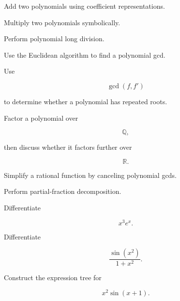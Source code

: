 \begin{exercise}[2]
Add two polynomials using coefficient representations.
\end{exercise}

\begin{exercise}[2]
Multiply two polynomials symbolically.
\end{exercise}

\begin{exercise}[3]
Perform polynomial long division.
\end{exercise}

\begin{exercise}[3]
Use the Euclidean algorithm to find a polynomial gcd.
\end{exercise}

\begin{exercise}[3]
Use

\[
\gcd(f,f')
\]

to determine whether a polynomial has repeated roots.
\end{exercise}

\begin{exercise}[3]
Factor a polynomial over

\[
\mathbb{Q},
\]

then discuss whether it factors further over

\[
\mathbb{R}.
\]
\end{exercise}

\begin{exercise}[2]
Simplify a rational function by canceling polynomial gcds.
\end{exercise}

\begin{exercise}[3]
Perform partial-fraction decomposition.
\end{exercise}

\begin{exercise}[2]
Differentiate

\[
x^3e^x.
\]
\end{exercise}

\begin{exercise}[3]
Differentiate

\[
\frac{\sin(x^2)}{1+x^2}.
\]
\end{exercise}

\begin{exercise}[3]
Construct the expression tree for

\[
x^2\sin(x+1).
\]
\end{exercise}

